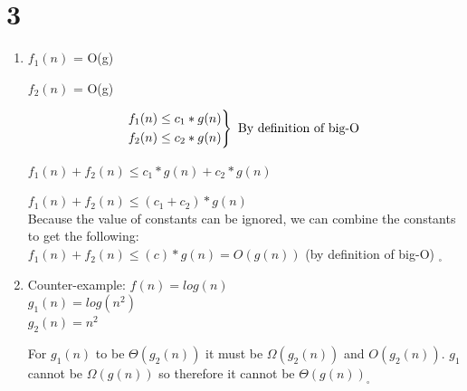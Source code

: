 \documentclass[10pt,a4paper]{report}
\begin{document}
	
	\newpage
	\section*{3}
	\begin{enumerate}[label=(\alph*)]
		\item 
		$f_1(n)$ = O(g)
		
		$f_2(n)$ = O(g)
		
		\begin{equation*}
		\begin{rcases}
		f_1(n) \le c_1 * g(n) \\
		f_2(n) \le c_2 * g(n)
		\end{rcases}
		\text{ By definition of big-O }
		\end{equation*}
		
		$f_1(n) + f_2(n) \le c_1 * g(n) + c_2 * g(n)$
		
		$f_1(n) + f_2(n) \le (c_1 + c_2) * g(n)$
		\\
		
		Because the value of constants can be ignored, we can combine the constants to get the following:
		\\
		
		$f_1(n) + f_2(n) \le (c) * g(n) = O(g(n))$ (by definition of big-O) $_\square$
		\\
		
		\item
		Counter-example:
		$f(n) = log(n)$\\
		$g_1(n) = log(n^2)$\\
		$g_2(n) = n^2$
		
		For $g_1(n)$ to be $\Theta(g_2(n))$ it must be $\Omega(g_2(n))$ and $O(g_2(n))$. $g_1$ cannot be $\Omega(g(n))$ so therefore it cannot be $\Theta(g(n)) _\square$

		
		
	\end{enumerate}


	\newpage
\end{document}
